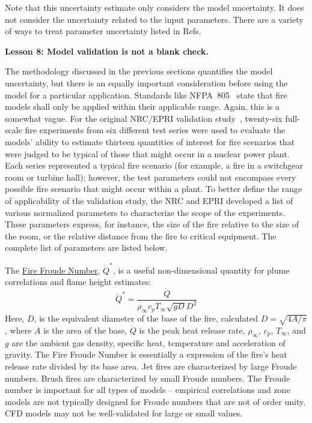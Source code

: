 \documentclass[fleqn,b5paper]{article}
\begin{document}
Note that this uncertainty estimate only considers the model uncertainty. It does not consider the uncertainty related to the input parameters. There are a variety of ways to treat parameter uncertainty listed in Refs.~\cite{ASTM:E1355,ISO16730,NUREG_1934,SFPE_G.06}




\vspace{\parskip}
{\bf Lesson 8: Model validation is not a blank check.}

The methodology discussed in the previous sections quantifies the model uncertainty, but there is an equally important consideration before using the model for a particular application. Standards like NFPA~805~\cite{NFPA_805} state that fire models shall only be applied within their applicable range. Again, this is a somewhat vague. For the original NRC/EPRI validation study~\cite{NUREG_1824}, twenty-six full-scale fire experiments from six different test series were used to evaluate the models' ability to estimate thirteen quantities of interest for fire scenarios that were judged to be typical of those that might occur in a nuclear power plant. Each series represented a typical fire scenario (for example, a fire in a switchgear room or turbine hall); however, the test parameters could not encompass every possible fire scenario that might occur within a plant. To better define the range of applicability of the validation study, the NRC and EPRI developed a list of various normalized parameters to characterize the scope of the experiments. These parameters express, for instance, the size of the fire relative to the size of the room, or the relative distance from the fire to critical equipment. The complete list of parameters are listed below.

The \underline{Fire Froude Number}, $\dot{Q}^*$, is a useful non-dimensional quantity for plume correlations and flame height estimates:
\begin{equation} 
   \dot{Q}^* = \frac{\dot{Q}}{\rho_\infty c_p T_\infty \sqrt{gD} D^2} 
\end{equation}
Here, $D$, is the equivalent diameter of the base of the fire, calculated $D=\sqrt{4A/\pi}$, where $A$ is the area of the base, $\dot{Q}$ is the peak heat release rate, $\rho_\infty$, $c_p$, $T_\infty$, and $g$ are the ambient gas density, specific heat, temperature and acceleration of gravity. The Fire Froude Number is essentially a expression of the fire's heat release rate divided by its base area. Jet fires are characterized by large Froude numbers. Brush fires are characterized by small Froude numbers. The Froude number is important for all types of models -- empirical correlations and zone models are not typically designed for Froude numbers that are not of order unity. CFD models may not be well-validated for large or small values.
\end{document}
